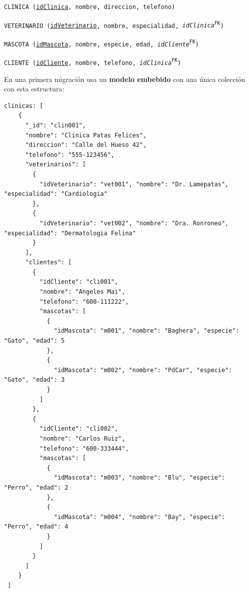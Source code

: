 \documentclass[10pt,a4paper,addpoints,answers]{exam}
\begin{document}
\begin{questions}
\texttt{CLINICA (\underline{idClinica}, nombre, direccion, telefono)}

\texttt{VETERINARIO (\underline{idVeterinario}, nombre, especialidad, \textit{idClinica}\textsuperscript{FK})}

\texttt{MASCOTA (\underline{idMascota}, nombre, especie, edad, \textit{idCliente}\textsuperscript{FK})}

\texttt{CLIENTE (\underline{idCliente}, nombre, telefono, \textit{idClinica}\textsuperscript{FK})}

En una primera migración usa un \textbf{modelo embebido} con una única colección con esta estructura:

\begin{lstlisting}[basicstyle=\scriptsize\ttfamily]
 clinicas: [
    {
      "_id": "clin001",
      "nombre": "Clinica Patas Felices",
      "direccion": "Calle del Hueso 42",
      "telefono": "555-123456",
      "veterinarios": [
        {
          "idVeterinario": "vet001", "nombre": "Dr. Lamepatas", "especialidad": "Cardiologia"
        },
        {
          "idVeterinario": "vet002", "nombre": "Dra. Ronroneo", "especialidad": "Dermatologia Felina"
        }
      ],
      "clientes": [
        {
          "idCliente": "cli001",
          "nombre": "Angeles Mai",
          "telefono": "600-111222",
          "mascotas": [
            {
              "idMascota": "m001", "nombre": "Baghera", "especie": "Gato", "edad": 5
            },
            {
              "idMascota": "m002", "nombre": "PdCar", "especie": "Gato", "edad": 3
            }
          ]
        },
        {
          "idCliente": "cli002",
          "nombre": "Carlos Ruiz",
          "telefono": "600-333444",
          "mascotas": [
            {
              "idMascota": "m003", "nombre": "Blu", "especie": "Perro", "edad": 2
            },
            {
              "idMascota": "m004", "nombre": "Bay", "especie": "Perro", "edad": 4
            }
          ]
        }
      ]
    }
 ]
\end{lstlisting}

\newpage
{}
\end{questions}
\end{document}
